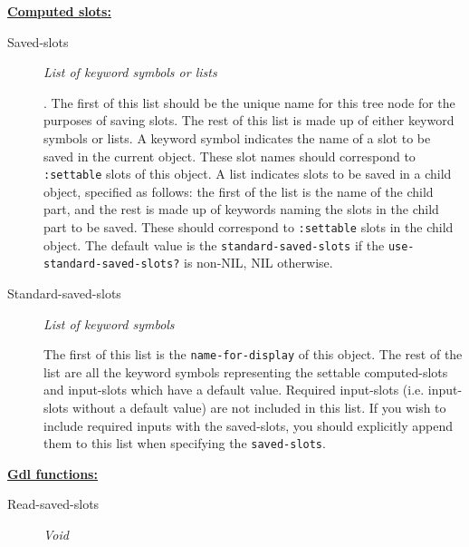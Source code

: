 \documentclass [11pt]{book}
\begin{document}
\begin{itemize}
\begin{description}
\end{description}






\textbf{
\underline{Computed slots:}}

\begin{description}

\item [Saved-slots]
\emph{List of keyword symbols or lists}

.
The first of this list should be the unique name for this tree node for the purposes of saving slots.
The rest of this list is made up of either keyword symbols or lists. A keyword symbol indicates the
name of a slot to be saved in the current object. These slot names should correspond to \texttt{:settable}
slots of this object. A list indicates slots to be saved in a child object, specified as
follows: the first of the list is the name of the child part, and the rest is made up of keywords naming
the slots in the child part to be saved. These should correspond to \texttt{:settable}
slots in the child object.
The default value is the \texttt{standard-saved-slots} if the \texttt{use-standard-saved-slots?} is non-NIL, NIL otherwise.




\item [Standard-saved-slots]
\emph{List of keyword symbols}

 The first of this list is the \texttt{name-for-display} of this object. The rest of the list
are all the keyword symbols representing the settable computed-slots and input-slots which have a default value. Required
input-slots (i.e. input-slots without a default value) are not included in this list. If you wish to include required
inputs with the saved-slots, you should explicitly append them to this list when specifying the \texttt{saved-slots}.




\end{description}






\textbf{
\underline{Gdl functions:}}

\begin{description}

\item [Read-saved-slots]
\emph{Void}


\end{description}
\end{itemize}
\end{document}
